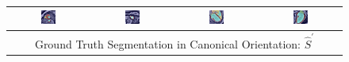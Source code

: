 \begin{figure}
\begin{center}
\begin{tabular}{cccc}
\includegraphics[width=0.19\textwidth]{./data/failures/HCMNet_2000062/00_SAX/9/9_pred.png} &
\includegraphics[width=0.19\textwidth]{./data/failures/HCMNet_2400044/00_SAX/2/5_pred.png} &
\includegraphics[width=0.19\textwidth]{./data/failures/HCMNet_2600079/01_HLA/00/0_pred.png} &
\includegraphics[width=0.19\textwidth]{./data/failures/HCMNet_2600079/02_VLA/00/0_pred.png} \\
\bottomrule

\multicolumn{4}{c}{Ground Truth Segmentation in Canonical Orientation: $\hat{S}^\prime$} \\


\end{tabular}
\end{center}
\end{figure}
